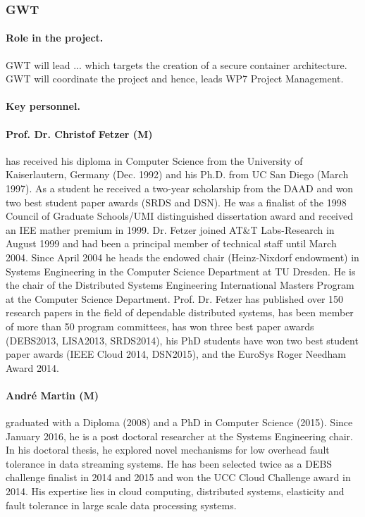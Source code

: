 
\subsubsection{GWT}

\noindent
%

\paragraph{Role in the project.} 
GWT will lead ... which targets the creation of a secure container architecture.
GWT will coordinate the \proj project and hence, leads WP7 Project Management.

\smallskip
\noindent
\paragraph{Key personnel.}

\paragraph{Prof. Dr. Christof Fetzer (M)} has received his diploma in Computer Science from the University of Kaiserlautern, Germany (Dec. 1992) and his Ph.D. from UC San Diego (March 1997). 
As a student he received a two-year scholarship from the DAAD and won two best student paper awards (SRDS and DSN). 
He was a finalist of the 1998 Council of Graduate Schools/UMI distinguished dissertation award and received an IEE mather premium in 1999. Dr. Fetzer joined AT\&T Labs-Research in August 1999 
and had been a principal member of technical staff until March 2004. 
Since April 2004 he heads the endowed chair (Heinz-Nixdorf endowment) in Systems Engineering in the Computer Science Department at TU Dresden. 
He is the chair of the Distributed Systems Engineering International Masters Program at the Computer Science Department. 
Prof. Dr. Fetzer has published over 150 research papers in the field of dependable distributed systems, has been member of more than 50 program committees, has won three best paper awards (DEBS2013, LISA2013, SRDS2014),   his PhD students have won two best student paper awards (IEEE Cloud 2014, DSN2015),  and the EuroSys Roger Needham Award 2014.

\smallskip
\noindent
\paragraph{Andr{\'e} Martin (M)} graduated with a Diploma (2008) and a PhD in Computer Science (2015).
Since January 2016, he is a post doctoral researcher at the Systems Engineering chair. 
In his doctoral thesis, he explored novel mechanisms for low overhead fault tolerance in data streaming systems.
He has been selected twice as a DEBS challenge finalist in 2014 and 2015 and won the UCC Cloud Challenge award in 2014.
His expertise lies in cloud computing, distributed systems, elasticity and fault tolerance in large scale data processing systems.

